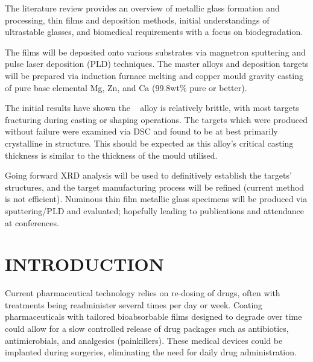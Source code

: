 \documentclass[a4paper,12pt,oneside]{report}%
\begin{document}
The literature review provides an overview of metallic glass formation and processing, thin films and deposition methods, initial understandings of ultrastable glasses, and biomedical requirements with a focus on biodegradation. 

The films will be deposited onto various substrates via magnetron sputtering and pulse laser deposition (PLD) techniques. The master alloys and deposition targets will be prepared via induction furnace melting and copper mould gravity casting of pure base elemental Mg, Zn, and Ca (99.8wt\% pure or better).

The initial results have shown the \MgZnCa~ alloy is relatively brittle, with most targets fracturing during casting or shaping operations. The targets which were produced without failure were examined via DSC and found to be at best primarily crystalline in structure. This should be expected as this alloy's critical casting thickness is similar to the thickness of the mould utilised. 

Going forward XRD analysis will be used to definitively establish the targets' structures, and the target manufacturing process will be refined (current method is not efficient).  Numinous thin film metallic glass specimens will be produced via sputtering/PLD and evaluated; hopefully leading to publications and attendance at conferences. 

\chapter{INTRODUCTION}
Current pharmaceutical technology relies on re-dosing of drugs, often with treatments being readminister several times per day or week. Coating pharmaceuticals with tailored bioabsorbable films designed to degrade over time could allow for a slow controlled release of drug packages such as antibiotics, antimicrobials, and analgesics (painkillers). These medical devices could be implanted during surgeries, eliminating the need for daily drug administration.  
\end{document}
